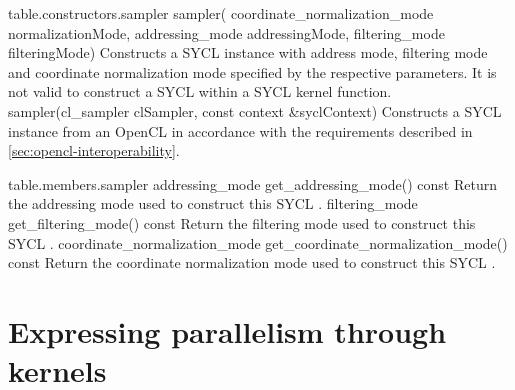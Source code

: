 {table.constructors.sampler}
  \addRowFourL
    {sampler(}
    {  coordinate_normalization_mode normalizationMode,}
    {  addressing_mode addressingMode,}
    {  filtering_mode filteringMode)}
    {
      Constructs a SYCL  instance with address mode, filtering mode and coordinate normalization mode specified by the respective parameters.
      It is not valid to construct a SYCL  within a SYCL kernel function.
    }
  \addRowTwoL
    { sampler(cl_sampler clSampler, }
    { const context \&syclContext) }
    {  
      Constructs a SYCL  instance from an OpenCL  in accordance with the requirements described in \ref{sec:opencl-interoperability}.
    }
\completeTable

{table.members.sampler}
  \addRow
    {addressing_mode get_addressing_mode() const}
    {
       Return the addressing mode used to construct this SYCL .
    }
  \addRow
    {filtering_mode get_filtering_mode() const}
    {
        Return the filtering mode used to construct this SYCL .
    }
  \addRow
    {coordinate_normalization_mode get_coordinate_normalization_mode() const}
    {
       Return the coordinate normalization mode used to construct this SYCL .
    }
\completeTable

\section{Expressing parallelism through kernels}
\label{sec:expr-parall-thro}



